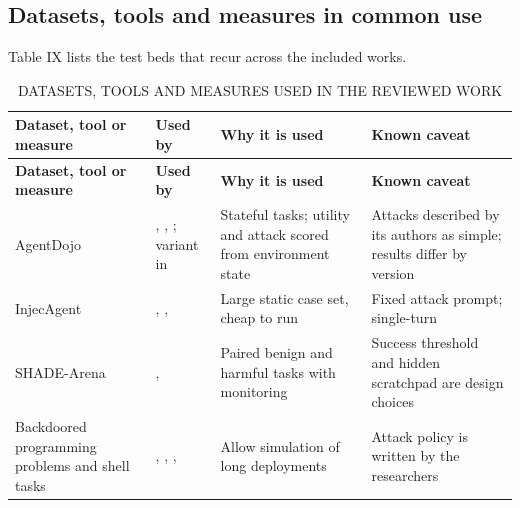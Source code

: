 \subsection{Datasets, tools and measures in common use}
Table IX lists the test beds that recur across the included works.

\begingroup
\fontsize{9}{10.5}\selectfont
\setlength{\tabcolsep}{1.4mm}
\renewcommand{\arraystretch}{1.08}
\begin{longtable}{|>{\raggedright\arraybackslash}p{30.03mm}|>{\raggedright\arraybackslash}p{31.61mm}|>{\raggedright\arraybackslash}p{47.41mm}|>{\raggedright\arraybackslash}p{49.00mm}|}
\caption{DATASETS, TOOLS AND MEASURES USED IN THE REVIEWED WORK}\\
\hline
\rowcolor{navy}\color{white}\bfseries Dataset, tool or measure & \color{white}\bfseries Used by & \color{white}\bfseries Why it is used & \color{white}\bfseries Known caveat\\\hline
\endfirsthead
\hline
\rowcolor{navy}\color{white}\bfseries Dataset, tool or measure & \color{white}\bfseries Used by & \color{white}\bfseries Why it is used & \color{white}\bfseries Known caveat\\\hline
\endhead
\endfoot
\endlastfoot
AgentDojo & \cite{r19}, \cite{r23}, \cite{r10}; variant in \cite{r27} & Stateful tasks; utility and attack scored from environment state & Attacks described by its authors as simple; results differ by version\\\hline
InjecAgent & \cite{r18}, \cite{r21}, \cite{r10} & Large static case set, cheap to run & Fixed attack prompt; single-turn\\\hline
SHADE-Arena & \cite{r34}, \cite{r36} & Paired benign and harmful tasks with monitoring & Success threshold and hidden scratchpad are design choices\\\hline
Backdoored programming problems and shell tasks & \cite{r32}, \cite{r33}, \cite{r37}, \cite{r35} & Allow simulation of long deployments & Attack policy is written by the researchers\\\hline
\end{longtable}
\endgroup

